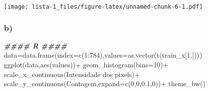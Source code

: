 \documentclass[
]{article}
\newenvironment{Shaded}{\begin{snugshade}}{\end{snugshade}}
\newcommand{\AttributeTok}[1]{\textcolor[rgb]{0.77,0.63,0.00}{#1}}
\newcommand{\DecValTok}[1]{\textcolor[rgb]{0.00,0.00,0.81}{#1}}
\newcommand{\DocumentationTok}[1]{\textcolor[rgb]{0.56,0.35,0.01}{\textbf{\textit{#1}}}}
\newcommand{\FloatTok}[1]{\textcolor[rgb]{0.00,0.00,0.81}{#1}}
\newcommand{\FunctionTok}[1]{\textcolor[rgb]{0.00,0.00,0.00}{#1}}
\newcommand{\NormalTok}[1]{#1}
\newcommand{\OtherTok}[1]{\textcolor[rgb]{0.56,0.35,0.01}{#1}}
\newcommand{\SpecialCharTok}[1]{\textcolor[rgb]{0.00,0.00,0.00}{#1}}
\newcommand{\StringTok}[1]{\textcolor[rgb]{0.31,0.60,0.02}{#1}}
\begin{document}
\begin{Shaded}
\end{Shaded}

\texttt{[image: lista-1\_files/figure-latex/unnamed-chunk-6-1.pdf]}

\hypertarget{b-3}{%
\subsubsection{b)}\label{b-3}}

\begin{Shaded}
\begin{Highlighting}[]
\DocumentationTok{\#\#\#\# R \#\#\#\#}
\NormalTok{data}\OtherTok{=}\FunctionTok{data.frame}\NormalTok{(}\AttributeTok{index=}\FunctionTok{c}\NormalTok{(}\DecValTok{1}\SpecialCharTok{:}\DecValTok{784}\NormalTok{),}\AttributeTok{values=}\FunctionTok{as.vector}\NormalTok{(}\FunctionTok{t}\NormalTok{(train\_x[}\DecValTok{1}\NormalTok{,])))}
\FunctionTok{ggplot}\NormalTok{(data,}\FunctionTok{aes}\NormalTok{(values))}\SpecialCharTok{+}
  \FunctionTok{geom\_histogram}\NormalTok{(}\AttributeTok{bins=}\DecValTok{10}\NormalTok{)}\SpecialCharTok{+}
  \FunctionTok{scale\_x\_continuous}\NormalTok{(}\StringTok{\textquotesingle{}Intensidade dos pixels\textquotesingle{}}\NormalTok{)}\SpecialCharTok{+}
  \FunctionTok{scale\_y\_continuous}\NormalTok{(}\StringTok{\textquotesingle{}Contagem\textquotesingle{}}\NormalTok{,}\AttributeTok{expand=}\FunctionTok{c}\NormalTok{(}\DecValTok{0}\NormalTok{,}\DecValTok{0}\NormalTok{,}\FloatTok{0.1}\NormalTok{,}\DecValTok{0}\NormalTok{))}\SpecialCharTok{+}
  \FunctionTok{theme\_bw}\NormalTok{()}
\end{Highlighting}
\end{Shaded}
\end{document}
